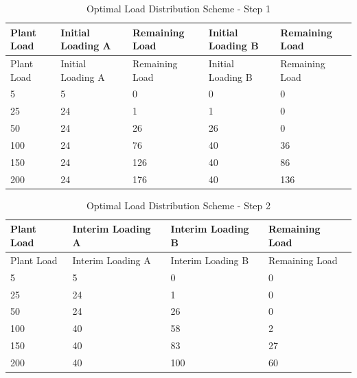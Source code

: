 \begin{longtable}[c]{|l|l|l|l|l|}
    \caption{Optimal Load Distribution Scheme - Step 1}
    \label{tab:optimal-load-step-1}\\

\hline
Plant Load & Initial Loading A & Remaining Load & Initial Loading B & Remaining Load \\ \hline
\endfirsthead

\hline
Plant Load & Initial Loading A & Remaining Load & Initial Loading B & Remaining Load \\ \hline
\endhead

5 & 5 & 0 & 0 & 0 \\ \hline
25 & 24 & 1 & 1 & 0 \\ \hline
50 & 24 & 26 & 26 & 0 \\ \hline
100 & 24 & 76 & 40 & 36 \\ \hline
150 & 24 & 126 & 40 & 86 \\ \hline
200 & 24 & 176 & 40 & 136 \\ \hline
\end{longtable}

\begin{longtable}[c]{|l|l|l|l|}
    \caption{Optimal Load Distribution Scheme - Step 2}
    \label{tab:optimal-load-step-2}\\

\hline
Plant Load & Interim Loading A & Interim Loading B & Remaining Load \\ \hline
\endfirsthead

\hline
Plant Load & Interim Loading A & Interim Loading B & Remaining Load \\ \hline
\endhead

5 & 5 & 0 & 0 \\ \hline
25 & 24 & 1 & 0 \\ \hline
50 & 24 & 26 & 0 \\ \hline
100 & 40 & 58 & 2 \\ \hline
150 & 40 & 83 & 27 \\ \hline
200 & 40 & 100 & 60 \\ \hline
\end{longtable}



